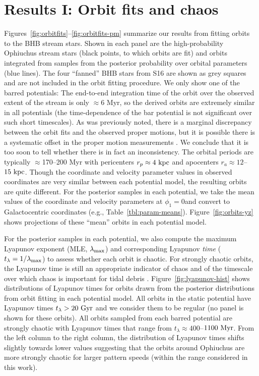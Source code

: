 \documentclass[letterpaper,12pt,preprint]{aastex}
\newcommand{\lyapexp}{\lambda_{\rm max}}
\newcommand{\lyapt}{t_\lambda}
\renewcommand{\changes}[1]{#1}
\begin{document}
\section{Results I: Orbit fits and chaos}\label{sec:results1}

Figures~\ref{fig:orbitfits}--\ref{fig:orbitfits-pm} summarize our results from fitting orbits to the BHB stream stars. Shown in each panel are the high-probability Ophiuchus stream stars (black points, to which orbits are fit) and orbits integrated from samples from the posterior probability over orbital parameters (blue lines). The four ``fanned'' BHB stars from S16 are shown as grey squares and are not included in the orbit fitting procedure. We only show one of the barred potentials: The end-to-end integration time of the orbit over the observed extent of the stream is only $\approx$6 Myr, so the derived orbits are extremely similar in all potentials (the time-dependence of the bar potential is not significant over such short timescales). \changes{As was previously noted, there is a marginal discrepancy between the orbit fits and the observed proper motions, but it is possible there is a systematic offset in the proper motion measurements \citep[see Figure~10 in][]{sesar15a}. We conclude that it is too soon to tell whether there is in fact an inconsistency.} The orbital periods are typically $\approx$170--200 Myr with pericenters $r_p \approx 4~{\rm kpc}$ and apocenters $r_a \approx 12$--$15~{\rm kpc}$. Though the coordinate and velocity parameter values in observed coordinates are very similar between each potential model, the resulting orbits are quite different. For the posterior samples in each potential, we take the mean values of the coordinate and velocity parameters \changes{at $\phi_1 = 0$}and convert to Galactocentric coordinates (e.g., Table~\ref{tbl:param-means}). Figure~\ref{fig:orbits-yz} shows projections of these ``mean'' orbits in each potential model.

For the posterior samples in each potential, we also compute the maximum Lyapunov exponent (MLE, $\lyapexp$) and corresponding Lyapunov \emph{time} ($\lyapt = 1/\lyapexp$) to assess whether each orbit is chaotic. For strongly chaotic orbits, the Lyapunov time is still an appropriate indicator of chaos and of the timescale over which chaos is important for tidal debris \citep{apw15-chaos}. Figure~\ref{fig:lyapunov-hist} shows distributions of Lyapunov times for orbits drawn from the posterior distributions from orbit fitting in each potential model. All orbits in the static potential have Lyapunov times $\lyapt > 20~{\rm Gyr}$ and we consider them to be regular (no panel is shown for these orbits). All orbits sampled from each barred potential are strongly chaotic with Lyapunov times that range from $\lyapt \approx 400$--$1100~{\rm Myr}$. \changes{From the left column to the right column, the distribution of Lyapunov times shifts slightly towards lower values suggesting that the orbits around Ophiuchus are more strongly chaotic for larger pattern speeds (within the range considered in this work).}
\end{document}
